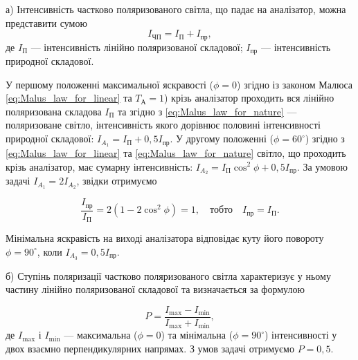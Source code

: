 \begin{solutionexample}
а) Інтенсивність частково поляризованого світла, що падає на
аналізатор, можна представити сумою
\begin{equation*}
    I_\text{ЧП} = I_\text{П} + I_\text{пр},
\end{equation*}
де $ I_\text{П} $ --- інтенсивність лінійно поляризованої складової; $ I_\text{пр} $ --- інтенсивність природної складової.

У першому положенні максимальної яскравості ($ \phi = 0 $) згідно із законом Малюса \eqref{eq:Malus_law_for_linear} та $ T_\text{А} = 1 $) крізь аналізатор проходить вся лінійно поляризована складова $ I_\text{П} $ та згідно з \eqref{eq:Malus_law_for_nature} --- поляризоване світло, інтенсивність якого дорівнює половині інтенсивності природної складової: $ I_{A_1} = I_\text{П} + 0,5I_\text{пр} $.
У другому положенні ($ \phi = 60^\circ $) згідно з \eqref{eq:Malus_law_for_linear} та \eqref{eq:Malus_law_for_nature} світло, що
проходить крізь аналізатор, має сумарну інтенсивність: $ I_{A_2} = I_\text{П} \cos^2\phi + 0,5I_\text{пр} $.
За умовою задачі $ I_{A_1} = 2I_{A_2} $, звідки отримуємо

\begin{equation*}
    \frac{I_\text{пр}}{I_\text{П}} = 2(1 - 2\cos^2 \phi) = 1,\quad \text{тобто} \quad I_\text{пр} = I_\text{П}.
\end{equation*}

Мінімальна яскравість на виході аналізатора відповідає куту його
повороту $ \phi = 90^\circ $, коли $ I_{A_3} = 0,5I_\text{пр} $.

б) Ступінь поляризації частково поляризованого світла характеризує
у ньому частину лінійно поляризованої складової та визначається за
формулою

\begin{equation*}
    P = \frac{I_{\max} - I_{\min}}{I_{\max} + I_{\min}},
\end{equation*}
де $ I_{\max} $ і $ I_{\min} $ --- максимальна ($ \phi = 0 $) та мінімальна ($ \phi = 90^\circ $) інтенсивності у двох взаємно перпендикулярних напрямах.
З умов задачі отримуємо $ P = 0,5 $.
\end{solutionexample}





